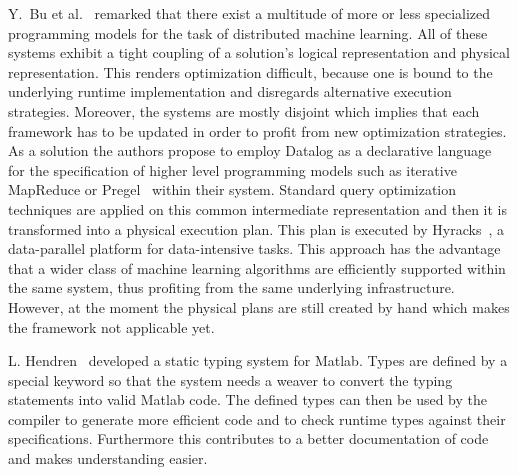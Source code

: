 Y.~Bu et al.~\cite{bu:apa2012a} remarked that there exist a multitude of more or less specialized programming models for the task of distributed machine learning.
All of these systems exhibit a tight coupling of a solution's logical representation and physical representation.
This renders optimization difficult, because one is bound to the underlying runtime implementation and disregards alternative execution strategies.
Moreover, the systems are mostly disjoint which implies that each framework has to be updated in order to profit from new optimization strategies.
As a solution the authors propose to employ Datalog as a declarative language for the specification of higher level programming models such as iterative MapReduce or Pregel~\cite{malewicz:2010a} within their system.
Standard query optimization techniques are applied on this common intermediate representation and then it is transformed into a physical execution plan.
This plan is executed by Hyracks~\cite{borkar:2011a}, a data-parallel platform for data-intensive tasks.
This approach has the advantage that a wider class of machine learning algorithms are efficiently supported within the same system, thus profiting from the same underlying infrastructure.
However, at the moment the physical plans are still created by hand which makes the framework not applicable yet.

L. Hendren~\cite{hendren:2011a} developed a static typing system for Matlab.
Types are defined by a special keyword so that the system needs a weaver to convert the typing statements into valid Matlab code.
The defined types can then be used by the compiler to generate more efficient code and to check runtime types against their specifications.
Furthermore this contributes to a better documentation of code and makes understanding easier.


